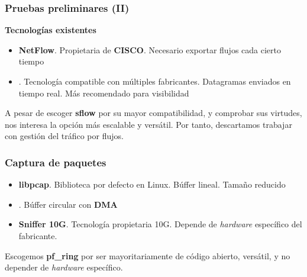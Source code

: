 \documentclass{beamer}
\begin{document}
\begin{frame}
\frametitle{Pruebas preliminares (II)}

\textbf{Tecnologías existentes}

\begin{itemize}
	\item \textbf{NetFlow}. Propietaria de \textbf{CISCO}. Necesario exportar flujos cada cierto tiempo
	\item \textbf{\color{purple}{sflow}}. Tecnología compatible con múltiples fabricantes. Datagramas enviados en tiempo real. Más recomendado para visibilidad
\end{itemize}

A pesar de escoger \textbf{sflow} por su mayor compatibilidad, y comprobar sus virtudes, nos interesa la opción más escalable y versátil. Por tanto, descartamos trabajar con gestión del tráfico por flujos.

\end{frame}


\begin{frame}
\frametitle{Captura de paquetes}

\begin{itemize}
	\item \textbf{libpcap}. Biblioteca por defecto en Linux. Búffer lineal. Tamaño reducido
	\item \textbf{\color{purple}{pf\_ring ZC}}. Búffer circular con \textbf{DMA}
	\item \textbf{Sniffer 10G}. Tecnología propietaria 10G. Depende de \textit{hardware} específico del fabricante.
\end{itemize}

Escogemos \textbf{pf\_ring} por ser mayoritariamente de código abierto, versátil, y no depender de \textit{hardware} específico.

\end{frame}

\end{document}
